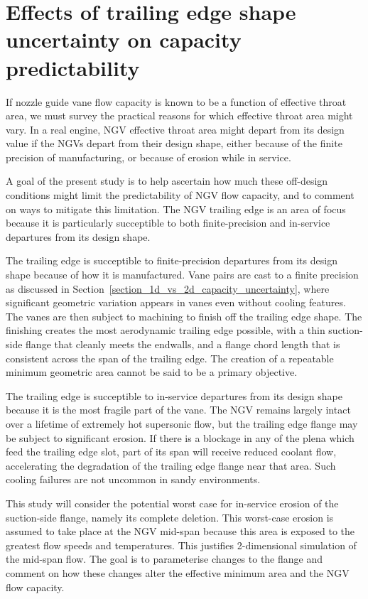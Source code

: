 \documentclass[a4paper, 11pt, oneside]{report}
\begin{document}
\section{Effects of trailing edge shape uncertainty on capacity predictability}

If nozzle guide vane flow capacity is known to be a function of effective throat area, we must survey the practical reasons for which effective throat area might vary. In a real engine, NGV effective throat area might depart from its design value if the NGVs depart from their design shape, either because of the finite precision of manufacturing, or because of erosion while in service. 

A goal of the present study is to help ascertain how much these off-design conditions might limit the predictability of NGV flow capacity, and to comment on ways to mitigate this limitation. The NGV trailing edge is an area of focus because it is particularly succeptible to both finite-precision and in-service departures from its design shape. 

The trailing edge is succeptible to finite-precision departures from its design shape because of how it is manufactured. Vane pairs are cast to a finite precision as discussed in Section~\ref{section_1d_vs_2d_capacity_uncertainty}, where significant geometric variation appears in vanes even without cooling features. The vanes are then subject to machining to finish off the trailing edge shape. The finishing creates the most aerodynamic trailing edge possible, with a thin suction-side flange that cleanly meets the endwalls, and a flange chord length that is consistent across the span of the trailing edge. The creation of a repeatable minimum geometric area cannot be said to be a primary objective.

The trailing edge is succeptible to in-service departures from its design shape because it is the most fragile part of the vane. The NGV remains largely intact over a lifetime of extremely hot supersonic flow, but the trailing edge flange may be subject to significant erosion. If there is a blockage in any of the plena which feed the trailing edge slot, part of its span will receive reduced coolant flow, accelerating the degradation of the trailing edge flange near that area. Such cooling failures are not uncommon in sandy environments.

This study will consider the potential worst case for in-service erosion of the suction-side flange, namely its complete deletion. This worst-case erosion is assumed to take place at the NGV mid-span because this area is exposed to the greatest flow speeds and temperatures. This justifies 2-dimensional simulation of the mid-span flow. The goal is to parameterise changes to the flange and comment on how these changes alter the effective minimum area and the NGV flow capacity.
\end{document}
